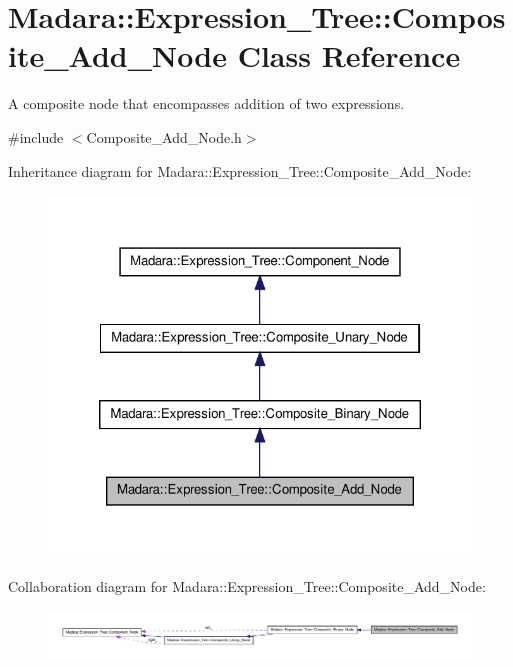 \hypertarget{classMadara_1_1Expression__Tree_1_1Composite__Add__Node}{
\section{Madara::Expression\_\-Tree::Composite\_\-Add\_\-Node Class Reference}
\label{df/d74/classMadara_1_1Expression__Tree_1_1Composite__Add__Node}
}


A composite node that encompasses addition of two expressions.  




{\ttfamily \#include $<$Composite\_\-Add\_\-Node.h$>$}



Inheritance diagram for Madara::Expression\_\-Tree::Composite\_\-Add\_\-Node:
\nopagebreak
\begin{figure}[H]
\begin{center}
\leavevmode
\includegraphics[width=322pt]{db/daa/classMadara_1_1Expression__Tree_1_1Composite__Add__Node__inherit__graph}
\end{center}
\end{figure}


Collaboration diagram for Madara::Expression\_\-Tree::Composite\_\-Add\_\-Node:
\nopagebreak
\begin{figure}[H]
\begin{center}
\leavevmode
\includegraphics[width=400pt]{d0/dea/classMadara_1_1Expression__Tree_1_1Composite__Add__Node__coll__graph}
\end{center}
\end{figure}
